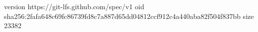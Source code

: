 version https://git-lfs.github.com/spec/v1
oid sha256:2fafa648c69fc86739fd8c7a887d65dd04812ccf912c4a440aba82f504f837bb
size 23382
